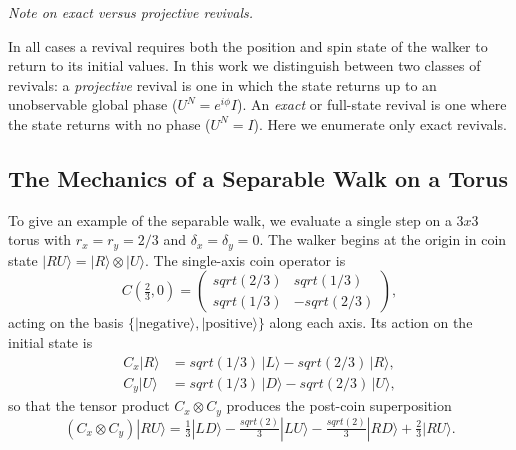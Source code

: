 \documentclass[aps,pra,reprint,amsmath,amssymb,superscriptaddress,floatfix]{revtex4-2}
\def\times{x}%
\def\rho{r}%
\def\sqrt#1{sqrt(#1)}%
\begin{document}
\emph{Note on exact versus projective revivals.}

In all cases a revival requires both the position and spin state of the walker to
return to its initial values.  In this work we distinguish between two classes of revivals:
a \emph{projective} revival is one in which the state returns up to an
unobservable global phase ($U^N = e^{i\phi} I$).  An \emph{exact}
or full-state revival is one where the state returns with no phase ($U^N = I$). 
Here we enumerate only exact revivals. 
\subsection{The Mechanics of a Separable Walk on a Torus}\par
To give an example of the separable walk, we evaluate a single step
on a $3 \times 3$ torus with $\rho_x = \rho_y = 2/3$ and
$\delta_x = \delta_y = 0$. The walker begins at the origin in coin
state $|RU\rangle = |R\rangle \otimes |U\rangle$. The single-axis coin
operator is
\begin{equation}
C\!\left(\tfrac{2}{3}, 0\right)
= \begin{pmatrix}
\sqrt{2/3} & \sqrt{1/3} \\
\sqrt{1/3} & -\sqrt{2/3}
\end{pmatrix},
\label{eq:coin-2-3}
\end{equation}
acting on the basis $\{|\text{negative}\rangle, |\text{positive}\rangle\}$
along each axis. Its action on the initial state is
\begin{align}
C_x |R\rangle &= \sqrt{1/3}\,|L\rangle - \sqrt{2/3}\,|R\rangle, \\
C_y |U\rangle &= \sqrt{1/3}\,|D\rangle - \sqrt{2/3}\,|U\rangle,
\end{align}
so that the tensor product $C_x \otimes C_y$ produces the post-coin
superposition
\begin{equation}
(C_x \otimes C_y)|RU\rangle
= \tfrac{1}{3}|LD\rangle - \tfrac{\sqrt{2}}{3}|LU\rangle
- \tfrac{\sqrt{2}}{3}|RD\rangle + \tfrac{2}{3}|RU\rangle.
\label{eq:post-coin}
\end{equation}
\end{document}
